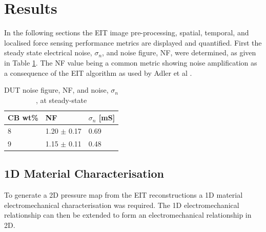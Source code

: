 \section{Results}\label{sec: Results}
In the following sections the EIT image pre-processing, spatial, temporal, and localised force sensing performance metrics are displayed and quantified. First the steady state electrical noise, $\sigma_n$, and noise figure, NF, were determined, as given in Table \ref{tab:DUT_noise}. The NF value being a common metric showing noise amplification as a consequence of the EIT algorithm as used by Adler et al \citep{Adler2009}.
\begin{table}[H]
\caption{DUT noise figure, NF, and noise, $\sigma_n$, at steady-state}
\label{tab:DUT_noise}
\begin{center}
\begin{tabular}{p{2cm}p{2cm}p{2cm}}
\hline
\textbf{CB wt\%} & \textbf{NF} & $\sigma_n$ [mS]\\ \hline
8           & 1.20 $\pm$ 0.17 & 0.69         \\
9           & 1.15 $\pm$ 0.11 & 0.48            \\ 
\hline
\end{tabular}
\end{center}
\end{table}


\subsection{1D Material Characterisation} \label{sec:1D Material Characterisation2}
To generate a 2D pressure map from the EIT reconstructions a 1D material electromechanical characterisation was required. The 1D electromechanical relationship can then be extended to form an electromechanical relationship in 2D.


